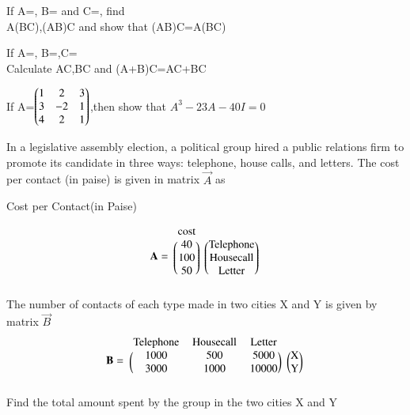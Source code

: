    
    \item If A=, B= and C=, find\\A(BC),(AB)C and show that (AB)C=A(BC) \\   
    
     \item If A=, B=,C=\\Calculate AC,BC and (A+B)C=AC+BC\\

    \item If A=$\begin{pmatrix}1 &2 &3\\3 &-2 &1\\4 &2 &1\end{pmatrix}$,then show that $A^3-23A-40I=0$
  \\  
  \solution
  
    
    
\item In a legislative assembly election, a political
group hired a public relations firm to promote
its candidate in three ways: telephone, house
calls, and letters. The cost per contact (in paise)
is given in matrix $\vec{A}$ as
\begin{center}
Cost per Contact(in Paise)
\end{center}
\begin{align}
    \vec{A}=
    \begin{blockarray}{cc}
    \text{cost}\\
    \begin{block}{(c)(c)}
    40 &\text{Telephone}\\
    100&\text{Housecall} \\
    50&\text{Letter}\\
    \end{block}
    \end{blockarray}
\end{align}
The number of contacts of each type made in
two cities X and Y is given by matrix $\vec{B}$
\begin{align}
    \vec{B} =
    \begin{blockarray}{cccc}
    \text{Telephone} & \text{Housecall} & \text{Letter} \\
    \begin{block}{(ccc)(c)}
    1000 & 500 & 5000 & \text{X}\\
    3000 & 1000 & 10000 & \text{Y} \\
    \end{block}
    \end{blockarray}
\end{align}
Find the total
amount spent by the group in the two cities
X and Y
%
\solution



